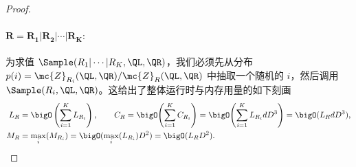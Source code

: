 \begin{proof}
\paragraph{$\mathbf{R = R_1 | R_2 | \cdots | R_K:}$} 为求值 $\Sample(R_1 | \cdots | R_K, \QL, \QR)$，我们必须先从分布 $p(i) = \mc{Z}_{R_i}(\QL, \QR) / \mc{Z}_R(\QL, \QR)$ 中抽取一个随机的 $i$，然后调用 $\Sample(R_i, \QL, \QR)$。这给出了整体运行时与内存用量的如下刻画
%
\begin{align*}
    L_R &= \bigO\left(\sum_{i=1}^K L_{R_i}\right), \qquad C_R = \bigO\!\left(\sum_{i=1}^K C_{R_i}\right) = \bigO\!\left(\sum_{i=1}^K L_{R_i} d D^3\right) = \bigO(L_R d D^3), \\
    M_R &= \max_i(M_{R_i}) = \bigO(\max_i(L_{R_i}) D^2) = \bigO(L_R D^2).
\end{align*}

\end{proof}

